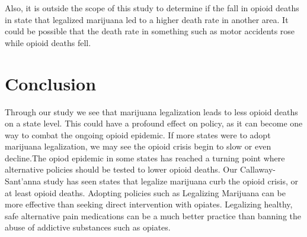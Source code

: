 \documentclass{article}
\begin{document}
Also, it is outside the scope of this study to determine if the fall in opioid deaths in state that legalized marijuana led to a higher death rate in another area. It could be possible that the death rate in something such as motor accidents rose while opioid deaths fell.


\section*{Conclusion}

Through our study we see that marijuana legalization leads to less opioid deaths on a state level. This could have a profound effect on policy, as it can become one way to combat the ongoing opioid epidemic. If more states were to adopt marijuana legalization, we may see the opioid crisis begin to slow or even decline.The opiod epidemic in some states has reached a turning point where alternative policies should be tested to lower opioid deaths.  Our Callaway-Sant'anna study has seen states that legalize marijuana curb the opioid crisis, or at least opioid deaths. Adopting policies such as Legalizing Marijuana can be more effective than seeking direct intervention with opiates. Legalizing healthy, safe alternative pain medications can be a much better practice than banning the abuse of addictive substances such as opiates.


\end{document}
